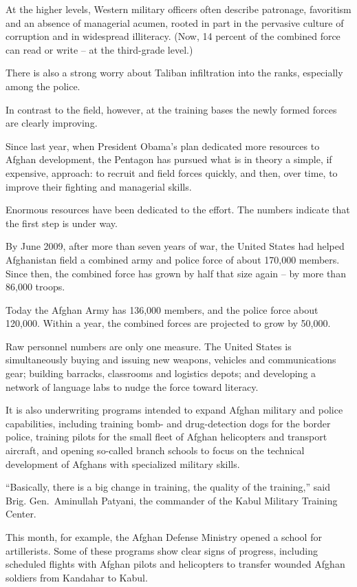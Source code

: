 ﻿\documentclass[12pt]{article}
\begin{document}
At the higher levels, Western military officers often describe patronage, favoritism and an absence
of managerial acumen, rooted in part in the pervasive culture of corruption and in widespread
illiteracy. (Now, 14 percent of the combined force can read or write -- at the third-grade level.)

There is also a strong worry about Taliban infiltration into the ranks, especially among the police.

In contrast to the field, however, at the training bases the newly formed forces are clearly
improving.

Since last year, when President Obama's plan dedicated more resources to Afghan development, the
Pentagon has pursued what is in theory a simple, if expensive, approach: to recruit and field forces
quickly, and then, over time, to improve their fighting and managerial skills.

Enormous resources have been dedicated to the effort. The numbers indicate that the first step is
under way.

By June 2009, after more than seven years of war, the United States had helped Afghanistan field a
combined army and police force of about 170,000 members. Since then, the combined force has grown by
half that size again -- by more than 86,000 troops.

Today the Afghan Army has 136,000 members, and the police force about 120,000. Within a year, the
combined forces are projected to grow by 50,000.

Raw personnel numbers are only one measure. The United States is simultaneously buying and issuing
new weapons, vehicles and communications gear; building barracks, classrooms and logistics depots;
and developing a network of language labs to nudge the force toward literacy.

It is also underwriting programs intended to expand Afghan military and police capabilities,
including training bomb- and drug-detection dogs for the border police, training pilots for the
small fleet of Afghan helicopters and transport aircraft, and opening so-called branch schools to
focus on the technical development of Afghans with specialized military skills.

``Basically, there is a big change in training, the quality of the training,'' said Brig.
Gen.~Aminullah Patyani, the commander of the Kabul Military Training Center.

This month, for example, the Afghan Defense Ministry opened a school for artillerists. Some of these
programs show clear signs of progress, including scheduled flights with Afghan pilots and
helicopters to transfer wounded Afghan soldiers from Kandahar to Kabul.
\end{document}
